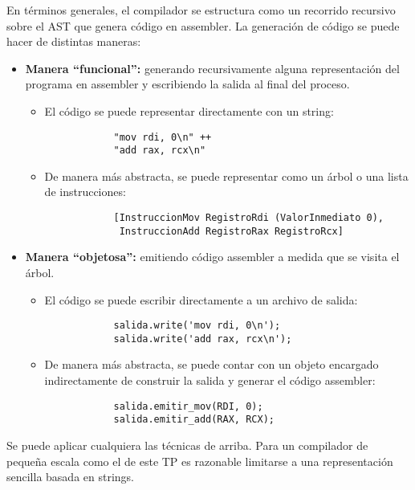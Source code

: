 \documentclass{article}
\begin{document}
En t\'erminos generales, el compilador se estructura
como un recorrido recursivo sobre el AST que genera
c\'odigo en assembler.
La generaci\'on de c\'odigo se puede hacer de distintas
maneras:
\begin{itemize}
\item
  {\bf Manera ``funcional'':}
  generando recursivamente alguna representaci\'on
  del programa en assembler
  y escribiendo la salida al final del proceso.
  \begin{itemize}
  \item El c\'odigo se puede representar directamente con un
        string:
        \begin{lstlisting}
            "mov rdi, 0\n" ++
            "add rax, rcx\n"
        \end{lstlisting}
  \item De manera m\'as abstracta, se puede representar
        como un \'arbol o una lista de instrucciones:
        \begin{lstlisting}
            [InstruccionMov RegistroRdi (ValorInmediato 0),
             InstruccionAdd RegistroRax RegistroRcx]
        \end{lstlisting}
  \end{itemize}
\item
  {\bf Manera ``objetosa'':}
  emitiendo c\'odigo assembler a medida que se visita
  el \'arbol.
  \begin{itemize}
  \item El c\'odigo se puede escribir directamente a un
        archivo de salida:\\
        \begin{lstlisting}
            salida.write('mov rdi, 0\n');
            salida.write('add rax, rcx\n');
        \end{lstlisting}
  \item De manera m\'as abstracta,
        se puede contar con
        un objeto encargado indirectamente de
        construir la salida y generar
        el c\'odigo assembler:
        \begin{lstlisting}
            salida.emitir_mov(RDI, 0);
            salida.emitir_add(RAX, RCX);
        \end{lstlisting}
  \end{itemize}
\end{itemize}
Se puede aplicar cualquiera las t\'ecnicas de arriba.
Para un compilador de peque\~na escala como el de este TP
es razonable limitarse a una representaci\'on
sencilla basada en strings.\bigskip
\end{document}
